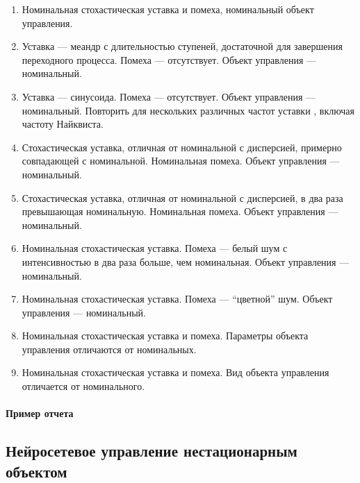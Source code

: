\begin{enumerate}
\item Номинальная стохастическая уставка и помеха, номинальный объект
  управления.
\item Уставка --- меандр с длительностью ступеней, достаточной для
  завершения переходного процесса.  Помеха --- отсутствует.  Объект
  управления --- номинальный.
\item Уставка --- синусоида.  Помеха --- отсутствует.  Объект
  управления --- номинальный.  Повторить для нескольких различных
  частот уставки , включая частоту Найквиста.
\item Стохастическая уставка, отличная от номинальной с дисперсией,
  примерно совпадающей с номинальной.  Номинальная помеха.  Объект
  управления --- номинальный.
\item Стохастическая уставка, отличная от номинальной с дисперсией, в
  два раза превышающая номинальную.  Номинальная помеха.  Объект
  управления --- номинальный.
\item Номинальная стохастическая уставка.  Помеха --- белый шум с
  интенсивностью в два раза больше, чем номинальная.  Объект
  управления --- номинальный.
\item Номинальная стохастическая уставка.  Помеха --- ``цветной'' шум.
  Объект управления --- номинальный.
\item Номинальная стохастическая уставка и помеха.  Параметры объекта
  управления отличаются от номинальных.
\item Номинальная стохастическая уставка и помеха.  Вид объекта
  управления отличается от номинального.
\end{enumerate}

\paragraph{Пример отчета}


\subsection{Нейросетевое управление нестационарным объектом}

